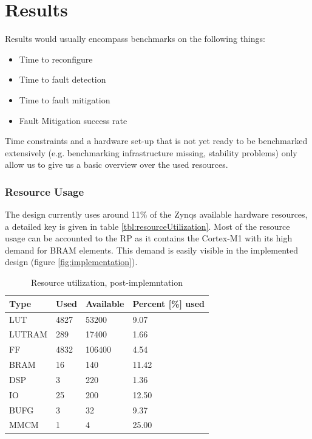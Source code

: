 \chapter{Results}
Results would usually encompass benchmarks on the following things:
\begin{itemize}
    \item Time to reconfigure
    \item Time to fault detection
    \item Time to fault mitigation
    \item Fault Mitigation success rate
\end{itemize}
Time constraints and a hardware set-up that is not yet ready to be benchmarked extensively (e.g. benchmarking infrastructure missing, stability problems) only allow us to give us a basic overview over the used resources.

\subsection{Resource Usage}
The design currently uses around 11\% of the Zynqs available hardware resources, a detailed key is given in table \ref{tbl:resourceUtilization}.
Most of the resource usage can be accounted to the \gls{RP} as it contains the Cortex-M1 with its high demand for BRAM elements.
This demand is easily visible in the implemented design (figure \ref{fig:implementation}).
\begin{table}
    \centering
\begin{tabular}{ l | l l l} 
Type    &Used&Available&Percent [\%] used\\
\hline
LUT	    &4827   &53200	&9.07\\
LUTRAM	&289    &17400	&1.66\\
FF	    &4832	&106400	&4.54\\
BRAM    &16	    &140	&    11.42\\
DSP	    &3	    &220	 &   1.36\\
IO	    &25	    &200	 &   12.50\\
BUFG	&3	    &32	    &9.37\\
MMCM	&1	     &4	    &25.00\\
\hline
\end{tabular}
\caption{Resource utilization, post-implemntation}
\end{table}\label{tbl:resourceUtilization}

